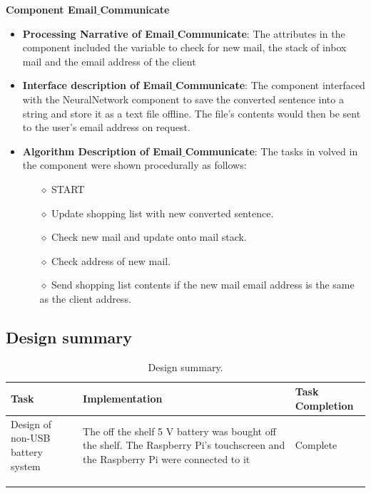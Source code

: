 \textbf{Component Email$\_$Communicate}
\begin{itemize}
	\item \textbf{Processing Narrative of Email$\_$Communicate}: The attributes in the component included the variable to check for new mail, the stack of inbox mail and the email address of the client
	\item  \textbf{Interface description of Email$\_$Communicate}: The component interfaced with the NeuralNetwork component to save the converted sentence into a string and store it as a text file offline. The file's contents would then be sent to the user's email address on request.
	\item \textbf{Algorithm Description of Email$\_$Communicate}: The tasks in volved in the component were shown procedurally as follows:
		\begin{itemize}
		\item[$\diamond$] START
		\item[$\diamond$] Update shopping list with new converted sentence.
		\item[$\diamond$] Check new mail and update onto mail stack.
		\item[$\diamond$] Check address of new mail.
		\item[$\diamond$] Send shopping list contents if the new mail email address is the same as the client address.
	\end{itemize}
\end{itemize}

\subsection{Design summary}
\begin{center}
	\begin{longtable}{|p{4cm}|p{7cm}|p{5cm}|}
		\hline 
		\textbf{Task} &
		\textbf{Implementation} &
		\textbf{Task Completion}
		\\
		\hline
		Design of non-USB battery system& The off the shelf 5 V battery was bought off the shelf. The Raspberry Pi's touchscreen and the Raspberry Pi were connected to it & Complete\\
		\hline
		&  &  \\
		\hline
		 &  & \\
		
		\hline
		\caption{Design summary.}
	\end{longtable}
\end{center}
\newpage


